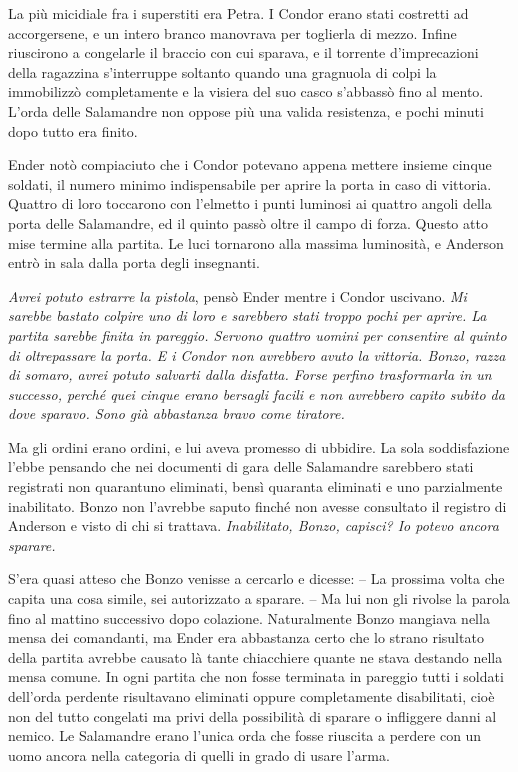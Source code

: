 {La più micidiale fra i superstiti era Petra. I Condor erano stati
	costretti ad accorgersene, e un intero branco manovrava per toglierla di
	mezzo. Infine riuscirono a congelarle il braccio con cui sparava, e il
	torrente d'imprecazioni della ragazzina s'interruppe soltanto quando una
	gragnuola di colpi la immobilizzò completamente e la visiera del suo
	casco s'abbassò fino al mento. L'orda delle Salamandre non oppose più
	una valida resistenza, e pochi minuti dopo tutto era finito.}

{Ender notò compiaciuto che i Condor potevano appena mettere insieme
	cinque soldati, il numero minimo indispensabile per aprire la porta in
	caso di vittoria. Quattro di loro toccarono con l'elmetto i punti
	luminosi ai quattro angoli della porta delle Salamandre, ed il quinto
	passò oltre il campo di forza. Questo atto mise termine alla partita. Le
	luci tornarono alla massima luminosità, e Anderson entrò in sala dalla
	porta degli insegnanti.}

\emph{{Avrei potuto estrarre la pistola}}{, \emph{} pensò Ender mentre i
	Condor uscivano. \emph{Mi sarebbe bastato colpire uno di loro e
		sarebbero stati troppo pochi per aprire. La partita sarebbe finita in
		pareggio. Servono quattro uomini per consentire al quinto di
		oltrepassare la porta. E i Condor non avrebbero avuto la vittoria.
		Bonzo, razza di somaro, avrei potuto salvarti dalla disfatta. Forse
		perfino trasformarla in un successo, perché quei cinque erano bersagli
		facili e non avrebbero capito subito da dove sparavo. Sono già
		abbastanza bravo come tiratore.}}

{Ma gli ordini erano ordini, e lui aveva promesso di ubbidire. La sola
	soddisfazione l'ebbe pensando che nei documenti di gara delle Salamandre
	sarebbero stati registrati non quarantuno eliminati, bensì quaranta
	eliminati e uno parzialmente inabilitato. Bonzo non l'avrebbe saputo
	finché non avesse consultato il registro di Anderson e visto di chi si
	trattava. \emph{Inabilitato, Bonzo, capisci? Io potevo ancora sparare.}}

{S'era quasi atteso che Bonzo venisse a cercarlo e dicesse: -- La
	prossima volta che capita una cosa simile, sei autorizzato a sparare. --
	Ma lui non gli rivolse la parola fino al mattino successivo dopo
	colazione. Naturalmente Bonzo mangiava nella mensa dei comandanti, ma
	Ender era abbastanza certo che lo strano risultato della partita avrebbe
	causato là tante chiacchiere quante ne stava destando nella mensa
	comune. In ogni partita che non fosse terminata in pareggio tutti i
	soldati dell'orda perdente risultavano eliminati oppure completamente
	disabilitati, cioè non del tutto congelati ma privi della possibilità di
	sparare o infliggere danni al nemico. Le Salamandre erano l'unica orda
	che fosse riuscita a perdere con un uomo ancora nella categoria di
	quelli in grado di usare l'arma.}

